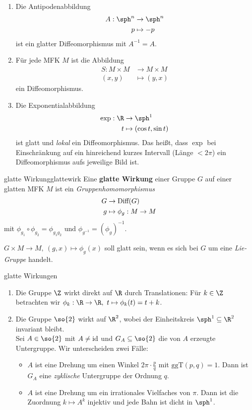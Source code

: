 \begin{beispiele}
\begin{enumerate}
\item Die Antipodenabbildung
\begin{align}
A: \sph^n &\to \sph^n \\
p &\mapsto -p
\end{align}
ist ein glatter Diffeomorphismus mit $A^{-1} = A$.
\item Für jede MFK $M$ ist die Abbildung
\begin{align}
S: M \times M &\to M \times M \\
(x, y) &\mapsto (y, x)
\end{align}
ein Diffeomorphismus.
\item Die Exponentialabbildung
\begin{align}
\exp: \R &\to \sph^1\\
t &\mapsto (\cos t, \sin t)
\end{align}
ist glatt und \textit{lokal} ein Diffeomorphismus. Das heißt, dass $\exp$ bei Einschränkung auf ein hinreichend kurzes Intervall (Länge $<2\pi$) ein Diffeomorphismus aufs jeweilige Bild ist.
\end{enumerate}
\end{beispiele}
\begin{definition}{glatte Wirkung}{glattewirk}
Eine \textbf{glatte Wirkung} einer Gruppe $G$ auf einer glatten MFK $M$ ist ein \textit{Gruppenhomomorphismus}
\begin{align}
G &\to \diffm (G)\\
g &\mapsto \phi_g: M \to M
\end{align}
mit $\phi_{g_1} \circ \phi_{g_2} = \phi_{g_1g_2}$ und $\phi_{g^{-1}}=(\phi_g)^{-1}$.
\end{definition}
$G \times M \to M, \ (g, x) \mapsto \phi_g(x)$ soll glatt sein, wenn es sich bei $G$ um eine \textit{Lie-Gruppe} handelt.
\begin{beispiele}glatte Wirkungen \\
\begin{enumerate}
\item Die Gruppe $\Z$ wirkt direkt auf $\R$ durch Translationen: Für $k \in \Z$ betrachten wir $\phi_k: \R \to \R, \ t \mapsto \phi_k(t)=t+k$.
\item Die Gruppe $\so{2}$ wirkt auf $\R^2$, wobei der Einheitskreis $\sph^1 \sub \R^2$ invariant bleibt.\\
Sei $A \in \so{2}$ mit $A \neq \text{id}$ und $G_A \sub \so{2}$ die von $A$ erzeugte Untergruppe. Wir unterscheiden zwei Fälle:
\begin{itemize}
\item $A$ ist eine Drehung um einen Winkel $2 \pi \cdot \frac{p}{q}$ mit $\text{ggT} (p,q) = 1$. Dann ist $G_A$ eine \textit{zyklische} Untergruppe der Ordnung $q$.
\item $A$ ist eine Drehung um ein irrationales Vielfaches von $\pi$. Dann ist die Zuordnung $k \mapsto A^k$ injektiv und jede Bahn ist dicht in $\sph^1$.
\end{itemize}
\end{enumerate}
\end{beispiele}
